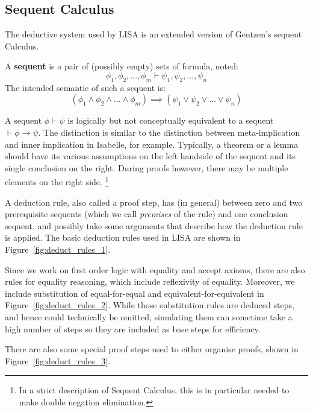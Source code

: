 \subsection{Sequent Calculus}
\label{subs:lk}
The deductive system used by LISA is an extended version of Gentzen's sequent Calculus.
\begin{defin}
A \textbf{sequent} is a pair of (possibly empty) sets of formula, noted:
$$\phi_1, \phi_2, ..., \phi_m \vdash \psi_1, \psi_2, ..., \psi_n$$
The intended semantic of such a sequent is:
\begin{equation}
\label{eq:SequentSemantic}
(\phi_1 \land \phi_2 \land ... \land \phi_m ) \implies (\psi_1 \lor \psi_2 \lor ... \lor \psi_n )
\end{equation}

\end{defin}
A sequent $\phi \vdash \psi$ is logically but not conceptually equivalent to a sequent $\vdash \phi \rightarrow \psi$. The distinction is similar to the distinction between meta-implication and inner implication in Isabelle, for example. Typically, a theorem or a lemma should have its various assumptions on the left handside of the sequent and its single conclusion on the right. During proofs however, there may be multiple elements on the right side. \footnote{In a strict description of Sequent Calculus, this is in particular needed to make double negation elimination.}

A deduction rule, also called a proof step, has  (in general) between zero and two prerequisite sequents (which we call \textit{premises} of the rule) and one conclusion sequent, and possibly take some arguments that describe how the deduction rule is applied. The basic deduction rules used in LISA are shown in Figure~\ref{fig:deduct_rules_1}.

Since we work on first order logic with equality and accept axioms, there are also rules for equality reasoning, which include reflexivity of equality. Moreover, we include substitution of equal-for-equal and equivalent-for-equivalent in Figure~\ref{fig:deduct_rules_2}. While those substitution rules are deduced steps, and hence could technically be omitted, simulating them can sometime take a high number of steps so  they are included as base steps for efficiency. 

There are also some special proof steps used to either organise proofs, shown in Figure~\ref{fig:deduct_rules_3}.

